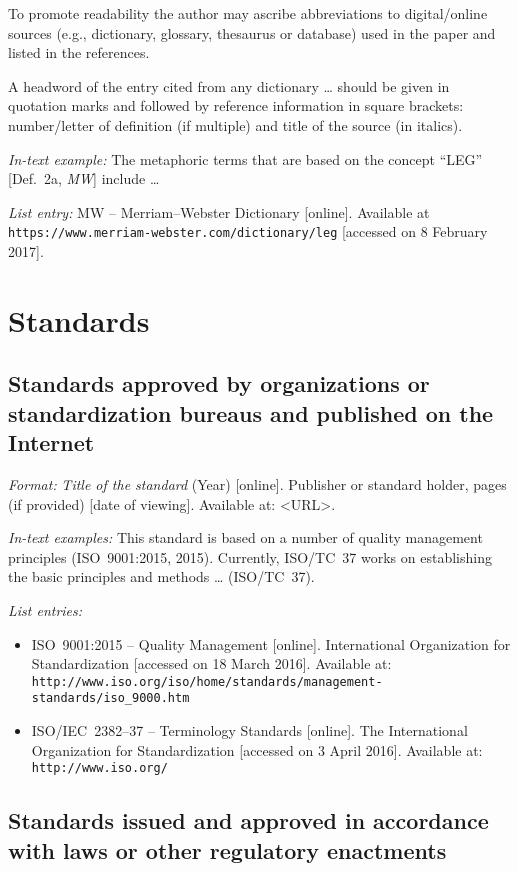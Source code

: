 To promote readability the author may ascribe abbreviations to digital/online sources (e.g., dictionary, glossary, thesaurus or database) used in the paper and listed in the references.

A headword of the entry cited from any dictionary \dots{} should be given in quotation marks and followed by reference information in square brackets: number/letter of definition (if multiple) and title of the source (in italics).

\emph{In-text example:} The metaphoric terms that are based on the concept ``LEG'' [Def.~2a, \emph{MW}] include \dots{}

\emph{List entry:} MW -- Merriam--Webster Dictionary [online]. Available at \verb|https://www.merriam-webster.com/dictionary/leg| [accessed on 8 February 2017].

\section{Standards}

\subsection*{Standards approved by organizations or standardization bureaus and published on the Internet}

\emph{Format:} \emph{Title of the standard} (Year) [online]. Publisher or standard holder, pages (if provided) [date of viewing]. Available at: \textless URL\textgreater.

\emph{In-text examples:} This standard is based on a number of quality management principles (ISO~9001{:}2015, 2015). Currently, ISO/TC~37 works on establishing the basic principles and methods \dots{} (ISO/TC~37).

\emph{List entries:}
\begin{itemize}
  \item ISO~9001{:}2015 -- Quality Management [online]. International Organization for Standardization [accessed on 18 March 2016]. Available at: \verb|http://www.iso.org/iso/home/standards/management-standards/iso_9000.htm|
  \item ISO/IEC~2382--37 -- Terminology Standards [online]. The International Organization for Standardization [accessed on 3 April 2016]. Available at: \verb|http://www.iso.org/|
\end{itemize}

\subsection*{Standards issued and approved in accordance with laws or other regulatory enactments}

